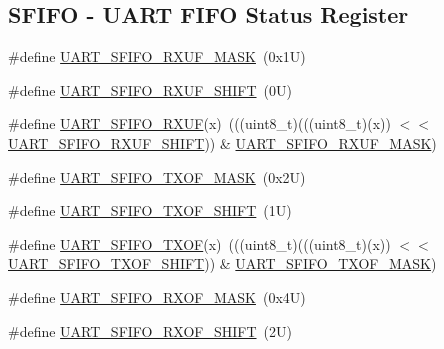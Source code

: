 \subsection*{S\+F\+I\+FO -\/ U\+A\+RT F\+I\+FO Status Register}
\begin{DoxyCompactItemize}
\item 
\#define \mbox{\hyperlink{group___u_a_r_t___register___masks_ga05a2524e2dabd91dddf527a472744bab}{U\+A\+R\+T\+\_\+\+S\+F\+I\+F\+O\+\_\+\+R\+X\+U\+F\+\_\+\+M\+A\+SK}}~(0x1\+U)
\item 
\#define \mbox{\hyperlink{group___u_a_r_t___register___masks_ga6c82c75944a1162ef6db65575b3e9c0d}{U\+A\+R\+T\+\_\+\+S\+F\+I\+F\+O\+\_\+\+R\+X\+U\+F\+\_\+\+S\+H\+I\+FT}}~(0\+U)
\item 
\#define \mbox{\hyperlink{group___u_a_r_t___register___masks_ga852c761060d0bbc667d9a7ef62167bc1}{U\+A\+R\+T\+\_\+\+S\+F\+I\+F\+O\+\_\+\+R\+X\+UF}}(x)~(((uint8\+\_\+t)(((uint8\+\_\+t)(x)) $<$$<$ \mbox{\hyperlink{group___u_a_r_t___register___masks_ga6c82c75944a1162ef6db65575b3e9c0d}{U\+A\+R\+T\+\_\+\+S\+F\+I\+F\+O\+\_\+\+R\+X\+U\+F\+\_\+\+S\+H\+I\+FT}})) \& \mbox{\hyperlink{group___u_a_r_t___register___masks_ga05a2524e2dabd91dddf527a472744bab}{U\+A\+R\+T\+\_\+\+S\+F\+I\+F\+O\+\_\+\+R\+X\+U\+F\+\_\+\+M\+A\+SK}})
\item 
\#define \mbox{\hyperlink{group___u_a_r_t___register___masks_ga53e9575053054705318b25e04c5b0f62}{U\+A\+R\+T\+\_\+\+S\+F\+I\+F\+O\+\_\+\+T\+X\+O\+F\+\_\+\+M\+A\+SK}}~(0x2\+U)
\item 
\#define \mbox{\hyperlink{group___u_a_r_t___register___masks_ga8bcebdd37ab0f89f58d3533577756444}{U\+A\+R\+T\+\_\+\+S\+F\+I\+F\+O\+\_\+\+T\+X\+O\+F\+\_\+\+S\+H\+I\+FT}}~(1\+U)
\item 
\#define \mbox{\hyperlink{group___u_a_r_t___register___masks_ga739c0f1a105489ea3c6c28e4d41b9233}{U\+A\+R\+T\+\_\+\+S\+F\+I\+F\+O\+\_\+\+T\+X\+OF}}(x)~(((uint8\+\_\+t)(((uint8\+\_\+t)(x)) $<$$<$ \mbox{\hyperlink{group___u_a_r_t___register___masks_ga8bcebdd37ab0f89f58d3533577756444}{U\+A\+R\+T\+\_\+\+S\+F\+I\+F\+O\+\_\+\+T\+X\+O\+F\+\_\+\+S\+H\+I\+FT}})) \& \mbox{\hyperlink{group___u_a_r_t___register___masks_ga53e9575053054705318b25e04c5b0f62}{U\+A\+R\+T\+\_\+\+S\+F\+I\+F\+O\+\_\+\+T\+X\+O\+F\+\_\+\+M\+A\+SK}})
\item 
\#define \mbox{\hyperlink{group___u_a_r_t___register___masks_ga6caec5dcdf0ff7a7498279579ca8003e}{U\+A\+R\+T\+\_\+\+S\+F\+I\+F\+O\+\_\+\+R\+X\+O\+F\+\_\+\+M\+A\+SK}}~(0x4\+U)
\item 
\#define \mbox{\hyperlink{group___u_a_r_t___register___masks_gab6ac120e58576ef4ff7f368b071c9f63}{U\+A\+R\+T\+\_\+\+S\+F\+I\+F\+O\+\_\+\+R\+X\+O\+F\+\_\+\+S\+H\+I\+FT}}~(2\+U)

\end{DoxyCompactItemize}
